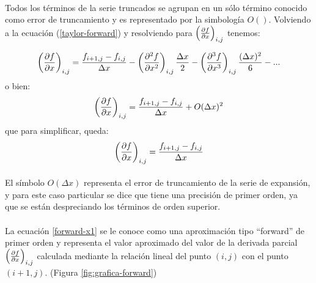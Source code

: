 \documentclass[letterpaper, openright, 12pt]{book}
\begin{document}
	\paragraph*{}
	Todos los términos de la serie truncados se agrupan en un sólo término conocido como error de truncamiento y es representado por la simbología $O()$. Volviendo a la ecuación (\ref{taylor-forward}) y resolviendo para $\left( \pdv{f}{x} \right)_{i,j}$ tenemos:
	
	\begin{equation}
	\left( \pdv{f}{x} \right)_{i,j} = \frac{f_{i+1, j} - f_{i,j}}{\Delta x} - \left( \pdv[2]{f}{x} \right)_{i,j} \frac{\Delta x}{2} - \left( \pdv[3]{f}{x} \right)_{i,j} \frac{(\Delta x)^2}{6} - ...
	\end{equation}
	o bien:
	\begin{equation*}
		\left( \pdv{f}{x} \right)_{i,j} = \frac{f_{i+1, j} - f_{i,j}}{\Delta x} + O(\Delta x)^2
	\end{equation*}
	que para simplificar, queda:\\
	\begin{equation}
	\left( \pdv{f}{x} \right)_{i,j} = \frac{f_{i+1, j} - f_{i,j}}{\Delta x}
	\label{forward-x1}
	\end{equation}
	
	\paragraph*{}
	El símbolo $O(\Delta x)$ representa el error de truncamiento de la serie de expansión, y para este caso particular se dice que tiene una precisión de primer orden, ya que se están despreciando los términos de orden superior.
	
	\paragraph*{}
	La ecuación \ref{forward-x1} se le conoce como una aproximación tipo ``forward'' de primer orden y representa el valor aproximado del valor de la derivada parcial $\left( \pdv{f}{x}\right)_{i,j}$ calculada mediante la relación lineal del punto $(i,j)$ con el punto $(i+1,j)$. (Figura \ref{fig:grafica-forward})
	
\end{document}
